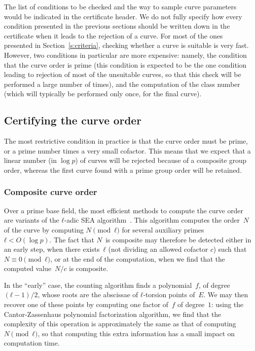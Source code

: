\documentclass[twocolumn,letterpaper,10pt]{article}
\begin{document}
The list of conditions to be checked and the way to sample
curve parameters would be indicated in the certificate header.
We do not fully specify how every condition presented
in the previous sections should be written down in the
certificate when it leads to the rejection of a curve.
For most of the ones presented in Section~\ref{s:criteria},
checking whether a curve is suitable is very fast.
However, two conditions in particular are more expensive:
namely, the condition that the curve order is prime
(this condition is expected to be the one condition
leading to rejection of most of the unsuitable curves,
so that this check will be performed a large number of times),
and the computation of the class number
(which will typically be performed only once, for the final curve).

\subsection{Certifying the curve order}

The most restrictive condition in practice is that
the curve order must be prime, or a prime number
times a very small cofactor.
This means that we expect that a linear number (in $\log p$)
of curves will be rejected because of a composite group order,
whereas the first curve found with a prime group order
will be retained.

\subsubsection{Composite curve order}

Over a prime base field,
the most efficient methods to compute the curve order are
variants of the $ℓ$-adic SEA algorithm~\cite{mathcomp1985schoof,
jtnb1995schoof,smf2008cl}.
This algorithm computes the order~$N$ of the curve
by computing $N \pmod{ℓ}$ for several
auxiliary primes~$ℓ < O(\log p)$.
The fact that $N$~is composite may therefore be detected
either in an early step,
when there exists~$ℓ$ (not dividing an allowed cofactor $c$)
such that $N ≡ 0 \pmod{ℓ}$,
or at the end of the computation,
when we find that the computed value~$N/c$ is composite.

In the “early” case,
the counting algorithm finds a polynomial~$f$, of degree~$(ℓ-1)/2$,
whose roots are the abscissae of $ℓ$-torsion points of~$E$.
We may then recover one of these points by
computing one factor of~$f$ of degree~$1$:
using the Cantor-Zassenhaus polynomial factorization algorithm,
we find that the complexity of this operation
is approximately the same as that of computing~$N \pmod{ℓ}$,
so that computing this extra information
has a small impact on computation time.
\end{document}
